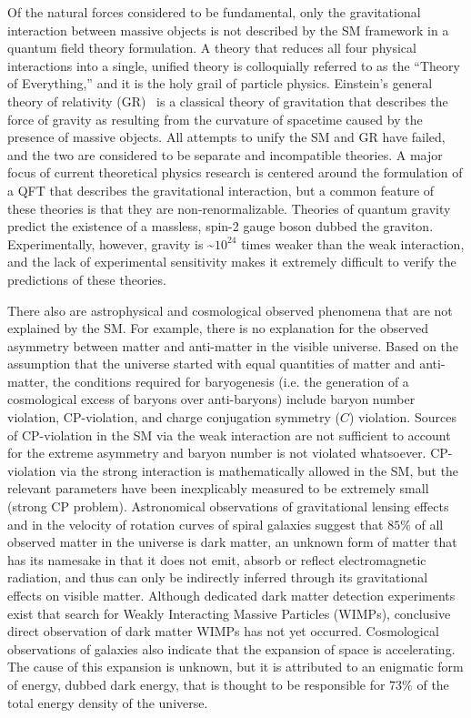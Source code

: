 \begin{refsection}
Of the natural forces considered to be fundamental, only the gravitational interaction between massive objects is not described by the SM framework in a quantum field theory formulation.
A theory that reduces all four physical interactions into a single, unified theory is colloquially referred to as the ``Theory of Everything,'' and it is the holy grail of particle physics.
Einstein's general theory of relativity (GR)~\cite{einstein1915feldgleichungen} is a classical theory of gravitation that describes the force of gravity as resulting from the curvature of spacetime caused by the presence of massive objects.
All attempts to unify the SM and GR have failed, and the two are considered to be separate and incompatible theories.
A major focus of current theoretical physics research is centered around the formulation of a QFT that describes the gravitational interaction, but a common feature of these theories is that they are non-renormalizable.
Theories of quantum gravity predict the existence of a massless, spin-2 gauge boson dubbed the graviton.
Experimentally, however, gravity is \sim$10^{24}$ times weaker than the weak interaction, and the lack of experimental sensitivity makes it extremely difficult to verify the predictions of these theories.

There also are astrophysical and cosmological observed phenomena that are not explained by the SM.
For example, there is no explanation for the observed asymmetry between matter and anti-matter in the visible universe.
Based on the assumption that the universe started with equal quantities of matter and anti-matter, the conditions required for baryogenesis (i.e. the generation of a cosmological excess of baryons over anti-baryons) include baryon number violation, CP-violation, and charge conjugation symmetry ($C$) violation.
Sources of CP-violation in the SM via the weak interaction are not sufficient to account for the extreme asymmetry and baryon number is not violated whatsoever.
CP-violation via the strong interaction is mathematically allowed in the SM, but the relevant parameters have been inexplicably measured to be extremely small (strong CP problem).
Astronomical observations of gravitational lensing effects and in the velocity of rotation curves of spiral galaxies suggest that $85 \%$ of all observed matter in the universe is dark matter, an unknown form of matter that has its namesake in that it does not emit, absorb or reflect electromagnetic radiation, and thus can only be indirectly inferred through its gravitational effects on visible matter.
Although dedicated dark matter detection experiments exist that search for Weakly Interacting Massive Particles (WIMPs), conclusive direct observation of dark matter WIMPs has not yet occurred.
Cosmological observations of galaxies also indicate that the expansion of space is accelerating.
The cause of this expansion is unknown, but it is attributed to an enigmatic form of energy, dubbed dark energy, that is thought to be responsible for $73 \%$ of the total energy density of the universe.


\end{refsection}
